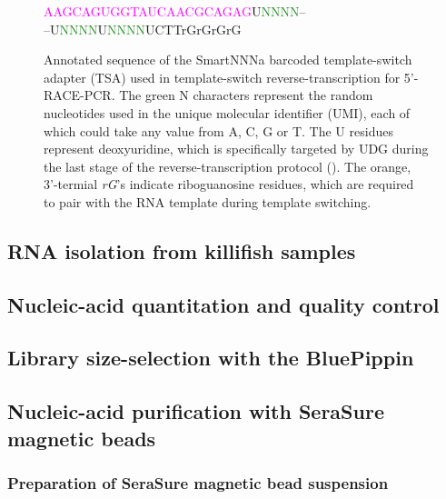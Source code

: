 \begin{figure}
\begin{center}
\LARGE
\textcolor{Fuchsia}{AAGCAGUGGTAUCAACGCAGAG}U\textcolor{ForestGreen}{NNNN}--\\--U\textcolor{ForestGreen}{NNNN}U\textcolor{ForestGreen}{NNNN}UCTT\textcolor{BurntOrange}{rGrGrGrG}
\end{center}
\caption{Annotated sequence of the SmartNNNa barcoded template-switch adapter (TSA) used in template-switch reverse-transcription for 5'-RACE-PCR. The green N characters represent the random nucleotides used in the unique molecular identifier (UMI), each of which could take any value from A, C, G or T. The U residues represent deoxyuridine, which is specifically targeted by UDG during the last stage of the reverse-transcription protocol (). The orange, 3'-termial \textit{rG}'s indicate riboguanosine residues, which are required to pair with the RNA template during template switching.}
\label{fig:tsa}
\end{figure}


\subsection{RNA isolation from killifish samples}

\subsection{Nucleic-acid quantitation and quality control}

\subsection{Library size-selection with the BluePippin}

\subsection{Nucleic-acid purification with SeraSure magnetic beads}

\subsubsection{Preparation of SeraSure magnetic bead suspension}

